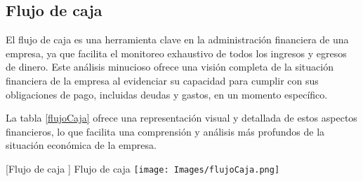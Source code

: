 \subsection{Flujo de caja}

El flujo de caja es una herramienta clave en la administración financiera de una empresa, ya que facilita el monitoreo exhaustivo de todos los ingresos y egresos de dinero. Este análisis minucioso ofrece una visión completa de la situación financiera de la empresa al evidenciar su capacidad para cumplir con sus obligaciones de pago, incluidas deudas y gastos, en un momento específico.

La tabla \ref{flujoCaja} ofrece una representación visual y detallada de estos aspectos financieros, lo que facilita una comprensión y análisis más profundos de la situación económica de la empresa.

\vspace{2mm}
\begin{minipage}{0.8\textwidth}
\centering
{}[{Flujo de caja }]{ Flujo de caja }
\label{flujoCaja}
\texttt{[image: Images/flujoCaja.png]}
\end{minipage}
\newpage